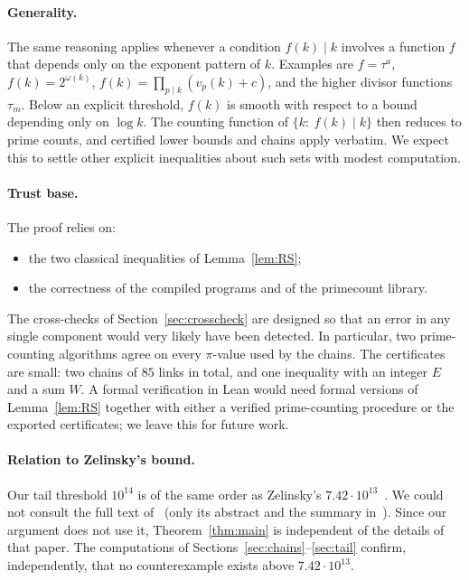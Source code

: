 \documentclass[11pt,a4paper]{article}
\theoremstyle{definition}
\begin{document}
\paragraph{Generality.}
The same reasoning applies whenever a condition $f(k)\mid k$ involves a function $f$ that depends only on the exponent pattern of $k$. Examples are $f=\tau^a$, $f(k)=2^{\omega(k)}$, $f(k)=\prod_{p\mid k}(v_p(k)+c)$, and the higher divisor functions $\tau_m$. Below an explicit threshold, $f(k)$ is smooth with respect to a bound depending only on $\log k$. The counting function of $\{k:\ f(k)\mid k\}$ then reduces to prime counts, and certified lower bounds and chains apply verbatim. We expect this to settle other explicit inequalities about such sets with modest computation.

\paragraph{Trust base.}
The proof relies on:
\begin{itemize}
\item the two classical inequalities of Lemma~\ref{lem:RS};
\item the correctness of the compiled programs and of the primecount library.
\end{itemize}
The cross-checks of Section~\ref{sec:crosscheck} are designed so that an error in any single component would very likely have been detected. In particular, two prime-counting algorithms agree on every $\pi$-value used by the chains. The certificates are small: two chains of $85$ links in total, and one inequality with an integer $E$ and a sum $W$. A formal verification in Lean would need formal versions of Lemma~\ref{lem:RS} together with either a verified prime-counting procedure or the exported certificates; we leave this for future work.

\paragraph{Relation to Zelinsky's bound.}
Our tail threshold $10^{14}$ is of the same order as Zelinsky's $7.42\cdot10^{13}$~\cite{Ze02}. We could not consult the full text of~\cite{Ze02} (only its abstract and the summary in~\cite{FC}). Since our argument does not use it, Theorem~\ref{thm:main} is independent of the details of that paper. The computations of Sections~\ref{sec:chains}--\ref{sec:tail} confirm, independently, that no counterexample exists above $7.42\cdot10^{13}$.
\end{document}
